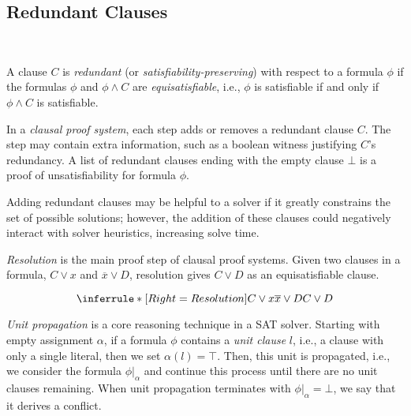 \subsection{Redundant Clauses}~\label{subsec:redundant}

A clause $C$ is \emph{redundant} (or \emph{satisfiability-preserving}) with
respect to a formula $\phi$ if the formulas $\phi$ and $\phi \land C$ are
\emph{equisatisfiable}, i.e., $\phi$ is satisfiable if and only if $\phi \land C$
is satisfiable.

In a \emph{clausal proof system}, each step adds or removes a redundant
clause $C$. The step may contain extra information, such as a boolean witness
justifying $C$'s redundancy. A list of redundant clauses ending with the
empty clause $\bot$ is a proof of unsatisfiability for formula $\phi$.


Adding redundant clauses may be helpful to a solver if it greatly
constrains the set of possible solutions; however, the addition of these clauses
could negatively interact with solver heuristics, increasing solve time.


\emph{Resolution} is the main proof step of clausal proof systems. Given two clauses in a formula, $C \lor x$ and $\overline{x} \lor D$, resolution gives $C \lor D$ as an equisatisfiable clause.

\begin{equation*}
    \inferrule*[Right=Resolution]{
        C \lor x \\ \overline{x} \lor D
    }{
        C \lor D
    }    
\end{equation*}

\emph{Unit propagation} is a core reasoning technique in a SAT solver. Starting with empty assignment $\alpha$, if a formula $\phi$ contains a \emph{unit clause} $l$, i.e., a clause with only a single literal, then we set $\alpha(l) = \top$. Then, this unit is propagated, i.e., we consider the formula $\phi|_\alpha$ and continue this process until there are no unit clauses remaining. When unit propagation terminates with $\phi|_\alpha = \bot$, we say that it derives a conflict.

